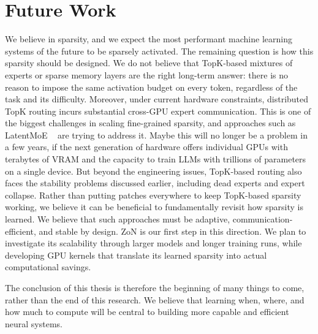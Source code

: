 \section{Future Work}
We believe in sparsity, and we expect the most performant machine learning systems
of the future to be sparsely activated. The remaining question is how
this sparsity should be designed. We do not believe that TopK-based
mixtures of experts or sparse memory layers are the right long-term
answer: there is no reason to impose the same activation budget on
every token, regardless of the task and its difficulty. Moreover, under
current hardware constraints, distributed TopK routing incurs substantial
cross-GPU expert communication. This is one of the biggest challenges in
scaling fine-grained sparsity, and approaches such as LatentMoE
~\citep{elango2026latentmoeoptimalaccuracyflop} are trying to address
it. Maybe this will no longer be a problem in a few years, if the next generation
of hardware offers individual GPUs with terabytes of VRAM and the capacity to train
LLMs with trillions of parameters on a single device.
But beyond the engineering issues, TopK-based
routing also faces the stability problems discussed earlier, including
dead experts and expert collapse. Rather than putting patches everywhere
to keep TopK-based sparsity working, we believe it can be beneficial to fundamentally
revisit how sparsity is learned. We believe that such approaches must be adaptive, communication-efficient,
and stable by design. ZoN is our first step in this direction. We plan
to investigate its scalability through larger models and longer training
runs, while developing GPU kernels that translate its learned sparsity
into actual computational savings.

The conclusion of this thesis is therefore the beginning of many things
to come, rather than the end of this research. We believe that learning
when, where, and how much to compute will be central to building more
capable and efficient neural systems.